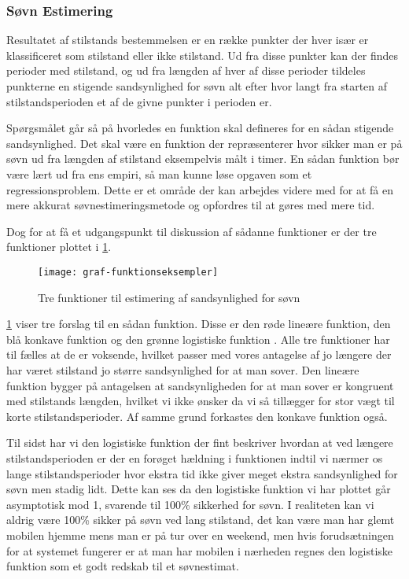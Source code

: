 \subsubsection{Søvn Estimering}
Resultatet af stilstands bestemmelsen er en række punkter der hver især er klassificeret som stilstand eller ikke stilstand.
Ud fra disse punkter kan der findes perioder med stilstand, og ud fra længden af hver af disse perioder tildeles punkterne en stigende sandsynlighed for søvn alt efter hvor langt fra starten af stilstandsperioden et af de givne punkter i perioden er.


Spørgsmålet går så på hvorledes en funktion skal defineres for en sådan stigende sandsynlighed.
Det skal være en funktion der repræsenterer hvor sikker man er på søvn ud fra længden af stilstand eksempelvis målt i timer.
En sådan funktion bør være lært ud fra ens empiri, så man kunne løse opgaven som et regressionsproblem.
Dette er et område der kan arbejdes videre med for at få en mere akkurat søvnestimeringsmetode og opfordres til at gøres med mere tid.

Dog for at få et udgangspunkt til diskussion af sådanne funktioner er der tre funktioner plottet i \cref{fig:trefunc}.
\begin{figure}[h]
	\centering
	\texttt{[image: graf-funktionseksempler]}
	\caption{Tre funktioner til estimering af sandsynlighed for søvn}\label{fig:trefunc}
\end{figure}

\cref{fig:trefunc} viser tre forslag til en sådan funktion.
Disse er den røde lineære funktion, den blå konkave funktion og den grønne logistiske funktion \citep{wiki:LogisticFunction}.
Alle tre funktioner har til fælles at de er voksende, hvilket passer med vores antagelse af jo længere der har været stilstand jo større sandsynlighed for at man sover.
Den lineære funktion bygger på antagelsen at sandsynligheden for at man sover er kongruent med stilstands længden, hvilket vi ikke ønsker da vi så tillægger for stor vægt til korte stilstandsperioder.
Af samme grund forkastes den konkave funktion også.

Til sidst har vi den logistiske funktion der fint beskriver hvordan at ved længere stilstandsperioden er der en forøget hældning i funktionen indtil vi nærmer os lange stilstandsperioder hvor ekstra tid ikke giver meget ekstra sandsynlighed for søvn men stadig lidt. 
Dette kan ses da den logistiske funktion vi har plottet går asymptotisk mod 1, svarende til 100\% sikkerhed for søvn.
I realiteten kan vi aldrig være 100\% sikker på søvn ved lang stilstand, det kan være man har glemt mobilen hjemme mens man er på tur over en weekend, men hvis forudsætningen for at systemet fungerer er at man har mobilen i nærheden regnes den logistiske funktion som et godt redskab til et søvnestimat.

